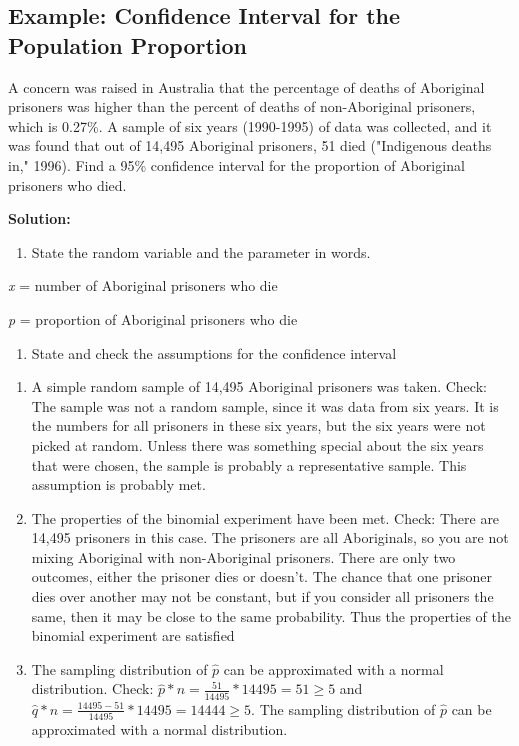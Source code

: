 \documentclass[]{book}
\providecommand{\tightlist}{%
  \setlength{\itemsep}{0pt}\setlength{\parskip}{0pt}}
\begin{document}
\hypertarget{example-confidence-interval-for-the-population-proportion}{%
\subsection{Example: Confidence Interval for the Population Proportion}\label{example-confidence-interval-for-the-population-proportion}}

A concern was raised in Australia that the percentage of deaths of Aboriginal prisoners was higher than the percent of deaths of non-Aboriginal prisoners, which is 0.27\%. A sample of six years (1990-1995) of data was collected, and it was found that out of 14,495 Aboriginal prisoners, 51 died ("Indigenous deaths in," 1996). Find a 95\% confidence interval for the proportion of Aboriginal prisoners who died.

\textbf{Solution:}

\begin{enumerate}
\def\labelenumi{\arabic{enumi}.}
\tightlist
\item
  State the random variable and the parameter in words.
\end{enumerate}

\emph{x} = number of Aboriginal prisoners who die

\emph{p} = proportion of Aboriginal prisoners who die

\begin{enumerate}
\def\labelenumi{\arabic{enumi}.}
\setcounter{enumi}{1}
\tightlist
\item
  State and check the assumptions for the confidence interval
\end{enumerate}

\begin{enumerate}
\def\labelenumi{\alph{enumi}.}
\item
  A simple random sample of 14,495 Aboriginal prisoners was taken. Check: The sample was not a random sample, since it was data from six years. It is the numbers for all prisoners in these six years, but the six years were not picked at random. Unless there was something special about the six years that were chosen, the sample is probably a representative sample. This assumption is probably met.
\item
  The properties of the binomial experiment have been met. Check: There are 14,495 prisoners in this case. The prisoners are all Aboriginals, so you are not mixing Aboriginal with non-Aboriginal prisoners. There are only two outcomes, either the prisoner dies or doesn't. The chance that one prisoner dies over another may not be constant, but if you consider all prisoners the same, then it may be close to the same probability. Thus the properties of the binomial experiment are satisfied
\item
  The sampling distribution of \(\hat{p}\) can be approximated with a normal distribution. Check: \(\hat{p}*n=\frac{51}{14495}*14495=51\ge5\) and \(\hat{q}*n=\frac{14495-51}{14495}*14495=14444\ge5\). The sampling distribution of \(\hat{p}\) can be approximated with a normal distribution.
\end{enumerate}
\end{document}
